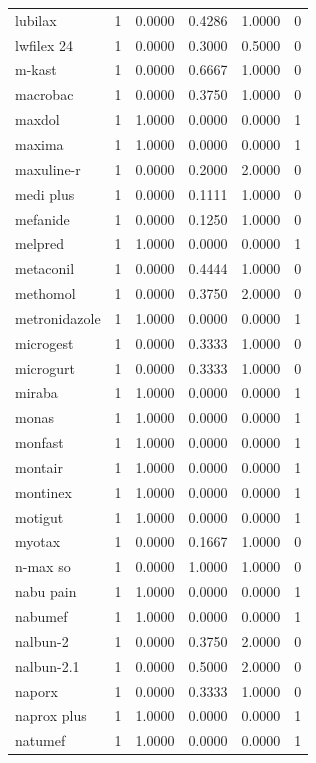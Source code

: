 \begin{longtable}{p{3.0cm}rrrrr}
lubilax & 1 & 0.0000 & 0.4286 & 1.0000 & 0 \\
lwfilex 24 & 1 & 0.0000 & 0.3000 & 0.5000 & 0 \\
m-kast & 1 & 0.0000 & 0.6667 & 1.0000 & 0 \\
macrobac & 1 & 0.0000 & 0.3750 & 1.0000 & 0 \\
maxdol & 1 & 1.0000 & 0.0000 & 0.0000 & 1 \\
maxima & 1 & 1.0000 & 0.0000 & 0.0000 & 1 \\
maxuline-r & 1 & 0.0000 & 0.2000 & 2.0000 & 0 \\
medi plus & 1 & 0.0000 & 0.1111 & 1.0000 & 0 \\
mefanide & 1 & 0.0000 & 0.1250 & 1.0000 & 0 \\
melpred & 1 & 1.0000 & 0.0000 & 0.0000 & 1 \\
metaconil & 1 & 0.0000 & 0.4444 & 1.0000 & 0 \\
methomol & 1 & 0.0000 & 0.3750 & 2.0000 & 0 \\
metronidazole & 1 & 1.0000 & 0.0000 & 0.0000 & 1 \\
microgest & 1 & 0.0000 & 0.3333 & 1.0000 & 0 \\
microgurt & 1 & 0.0000 & 0.3333 & 1.0000 & 0 \\
miraba & 1 & 1.0000 & 0.0000 & 0.0000 & 1 \\
monas & 1 & 1.0000 & 0.0000 & 0.0000 & 1 \\
monfast & 1 & 1.0000 & 0.0000 & 0.0000 & 1 \\
montair & 1 & 1.0000 & 0.0000 & 0.0000 & 1 \\
montinex & 1 & 1.0000 & 0.0000 & 0.0000 & 1 \\
motigut & 1 & 1.0000 & 0.0000 & 0.0000 & 1 \\
myotax & 1 & 0.0000 & 0.1667 & 1.0000 & 0 \\
n-max so & 1 & 0.0000 & 1.0000 & 1.0000 & 0 \\
nabu pain & 1 & 1.0000 & 0.0000 & 0.0000 & 1 \\
nabumef & 1 & 1.0000 & 0.0000 & 0.0000 & 1 \\
nalbun-2 & 1 & 0.0000 & 0.3750 & 2.0000 & 0 \\
nalbun-2.1 & 1 & 0.0000 & 0.5000 & 2.0000 & 0 \\
naporx & 1 & 0.0000 & 0.3333 & 1.0000 & 0 \\
naprox plus & 1 & 1.0000 & 0.0000 & 0.0000 & 1 \\
natumef & 1 & 1.0000 & 0.0000 & 0.0000 & 1 \\

\end{longtable}
